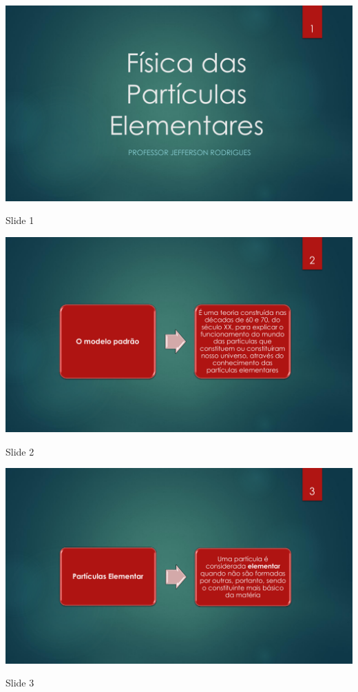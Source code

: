 \begin{figura}[ht]
	\centering
	\includegraphics[width=0.9 \textwidth]{ApeD/slide_1}
	\caption{Slide 1}
	\label{fig:app:slide_1}
\end{figura}

\begin{figura}[ht]
	\centering
	\includegraphics[width=0.9 \textwidth]{ApeD/slide_2}
	\caption{Slide 2}
	\label{fig:app:slide_2}
\end{figura}

\begin{figura}[ht]
	\centering
	\includegraphics[width=0.9 \textwidth]{ApeD/slide_3}
	\caption{Slide 3}
	\label{fig:app:slide_3}
\end{figura}

